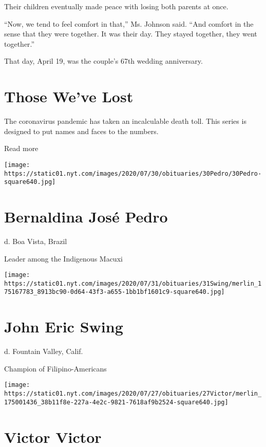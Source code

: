 Their children eventually made peace with losing both parents at once.

``Now, we tend to feel comfort in that,'' Ms. Johnson said. ``And
comfort in the sense that they were together. It was their day. They
stayed together, they went together.''

That day, April 19, was the couple's 67th wedding anniversary.

\href{https://www.nytimes.com/interactive/2020/obituaries/people-died-coronavirus-obituaries.html?action=click\&pgtype=Article\&state=default\&region=BELOW_MAIN_CONTENT\&context=covid_obits_promo}{}

\hypertarget{those-weve-lost}{%
\section{Those We've Lost}\label{those-weve-lost}}

The coronavirus pandemic has taken an incalculable death toll. This
series is designed to put names and faces to the numbers.

Read more

\texttt{[image: https://static01.nyt.com/images/2020/07/30/obituaries/30Pedro/30Pedro-square640.jpg]}

\hypertarget{bernaldina-josuxe9-pedro}{%
\section{Bernaldina José Pedro}\label{bernaldina-josuxe9-pedro}}

d. Boa Vista, Brazil

Leader among the Indigenous Macuxi

\texttt{[image: https://static01.nyt.com/images/2020/07/31/obituaries/31Swing/merlin\_175167783\_8913bc90-0d64-43f3-a655-1bb1bf1601c9-square640.jpg]}

\hypertarget{john-eric-swing}{%
\section{John Eric Swing}\label{john-eric-swing}}

d. Fountain Valley, Calif.

Champion of Filipino-Americans

\texttt{[image: https://static01.nyt.com/images/2020/07/27/obituaries/27Victor/merlin\_175001436\_38b11f8e-227a-4e2c-9821-7618af9b2524-square640.jpg]}

\hypertarget{victor-victor}{%
\section{Victor Victor}\label{victor-victor}}

